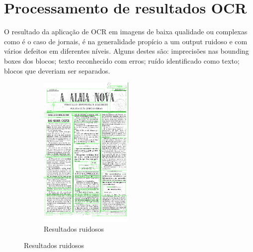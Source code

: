 \section{Processamento de resultados OCR}
\label{contribution_ocr_posprocessing}


O resultado da aplicação de OCR em imagens de baixa qualidade ou complexas como é o caso de jornais, é na generalidade propício a um output ruidoso e com vários defeitos em diferentes níveis. Alguns destes são: imprecisões nas bounding boxes dos blocos; texto reconhecido com erros; ruído identificado como texto; blocos que deveriam ser separados. 



\begin{figure}[H]
	\centering
	\begin{subfigure}{.5\textwidth}
		\centering
		\includegraphics[width=4.5cm]{images/ilustracoes/noisy_ocr_results.png}
		\caption{Resultados ruidosos}
		\label{fig:noisy_image}
	\end{subfigure}%


\end{figure}
